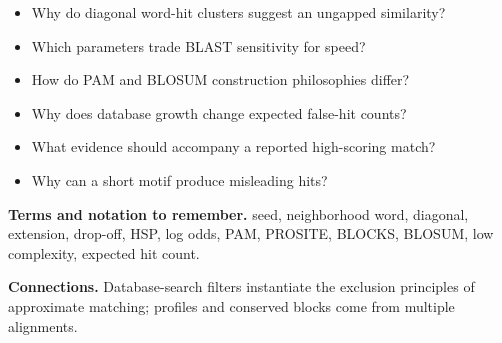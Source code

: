 \documentclass[11pt]{article}
\begin{document}
\begin{tcolorbox}[enhanced,breakable,title={Self-test questions},
  colback=white,colframe=Accent,fonttitle=\small\sffamily\bfseries,fontupper=\footnotesize,
  boxsep=0.6mm,left=1.5mm,right=1.5mm,top=1mm,bottom=1mm,before skip=3pt,after skip=3pt]
\begin{itemize}
  \item Why do diagonal word-hit clusters suggest an ungapped similarity?
  \item Which parameters trade BLAST sensitivity for speed?
  \item How do PAM and BLOSUM construction philosophies differ?
  \item Why does database growth change expected false-hit counts?
  \item What evidence should accompany a reported high-scoring match?
  \item Why can a short motif produce misleading hits?
\end{itemize}
\end{tcolorbox}

{\footnotesize
\textbf{Terms and notation to remember.} seed, neighborhood word, diagonal, extension, drop-off, HSP, log odds, PAM, PROSITE, BLOCKS, BLOSUM, low complexity, expected hit count.

\textbf{Connections.} Database-search filters instantiate the exclusion principles of approximate matching; profiles and conserved blocks come from multiple alignments.
}
\end{document}
